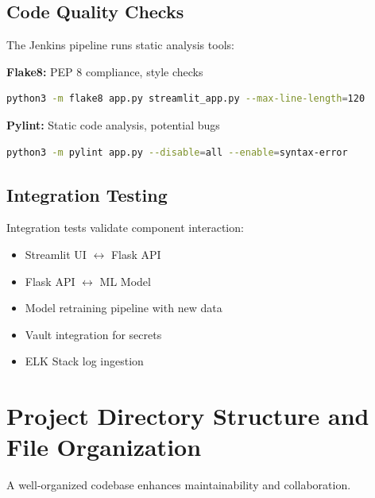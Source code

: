 \documentclass[12pt,a4paper]{report}
\begin{document}
\section{Code Quality Checks}

The Jenkins pipeline runs static analysis tools:

\textbf{Flake8:} PEP 8 compliance, style checks
\begin{lstlisting}[language=bash]
python3 -m flake8 app.py streamlit_app.py --max-line-length=120
\end{lstlisting}

\textbf{Pylint:} Static code analysis, potential bugs
\begin{lstlisting}[language=bash]
python3 -m pylint app.py --disable=all --enable=syntax-error
\end{lstlisting}

\section{Integration Testing}

Integration tests validate component interaction:
\begin{itemize}[leftmargin=2em]
    \item Streamlit UI $\leftrightarrow$ Flask API
    \item Flask API $\leftrightarrow$ ML Model
    \item Model retraining pipeline with new data
    \item Vault integration for secrets
    \item ELK Stack log ingestion
\end{itemize}

\chapter{Project Directory Structure and File Organization}

A well-organized codebase enhances maintainability and collaboration.
\end{document}
